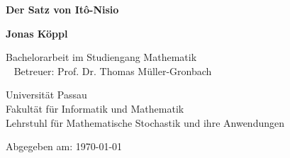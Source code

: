 \begin{titlepage}
    \begin{center}
        \vspace*{2cm}
        \Huge
        \textbf{Der Satz von Itô-Nisio}
  
        \vfill
        \Large
        \textbf{Jonas Köppl}
  
        \vfill
  
        Bachelorarbeit im Studiengang Mathematik \\
        \ 
        \newline 
        Betreuer: Prof. Dr. Thomas Müller-Gronbach
        
        \vspace{0.8cm}
  
  
        Universität Passau\\
        Fakultät für Informatik und Mathematik\\
        Lehrstuhl für Mathematische Stochastik und ihre Anwendungen
        \ 
        \newline 
        
        Abgegeben am: \today
  
    \end{center}
 \end{titlepage}